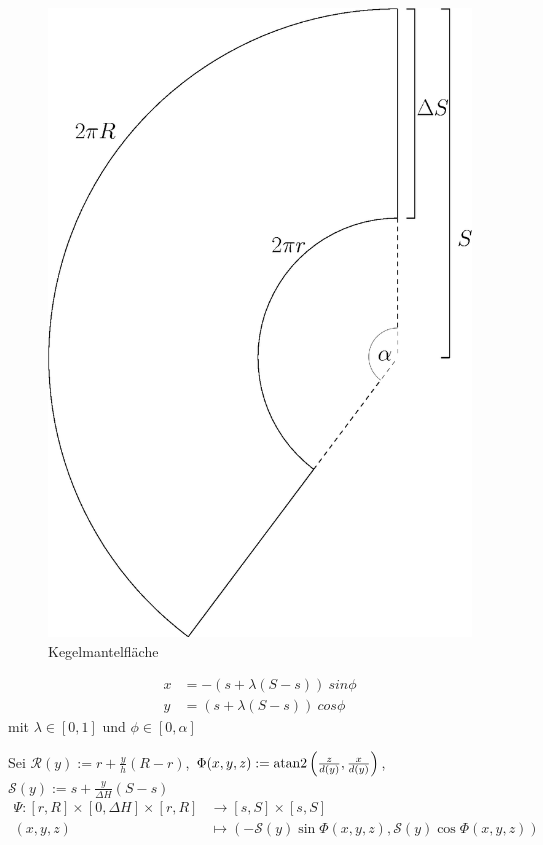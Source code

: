 \begin{figure}[!htb]
	\centering
	\includegraphics[scale=.4]{images/coneLateral.eps}
	\caption{Kegelmantelfläche}
	\label{fig:coneLateral}
\end{figure}


\begin{equation}
\begin{aligned}
x &= -(s + \lambda (S-s)) ~sin \phi \\
y &= (s + \lambda (S-s)) ~cos \phi
\end{aligned}
\end{equation}
mit $\lambda \in [0, 1]$ und $\phi \in [0, \alpha]$




Sei $\mathcal{R}(y) := r + \frac{y}{h} (R - r)$, $\Phi(x,y,z) := \text{atan2}\left(\frac{z}{d(y)}, \frac{x}{d(y)}\right)$, $\mathcal{S}(y) := s + \frac{y}{\Delta H} (S-s)$
\begin{equation}
\begin{aligned}
\Psi \colon [r,R] \times [0, \Delta H] \times [r,R] &\to [s,S] \times [s,S]\\
(x,y,z) &\mapsto \left(-\mathcal{S}(y)\sin \Phi(x,y,z), \mathcal{S}(y)\cos\Phi(x,y,z)\right) 
\end{aligned}
\end{equation}

